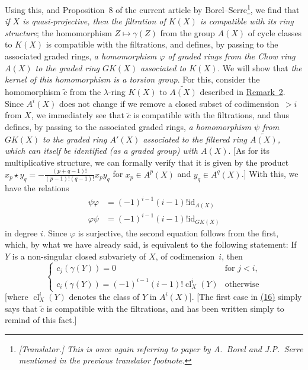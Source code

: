 \documentclass{article}
\DeclareMathOperator{\cl}{cl}
\newcommand{\oldpage}[1]{\marginpar{\footnotesize$\Big\vert$ \textit{p.~#1}}}
\begin{document}
\begin{enumerate}
    \renewcommand*{\thefootnote}{*}
    Using this, and Proposition~8 of the current article by Borel--Serre\footnote{\emph{[Translator.] This is once again referring to paper by A.~Borel and J.P.~Serre mentioned in the previous translator footnote.}}, we find that \emph{if $X$ is quasi-projective, then the filtration of $K(X)$ is compatible with its ring structure};
    the homomorphism $Z\mapsto\gamma(Z)$ from the group $A(X)$ of cycle classes to $K(X)$ is compatible with the filtrations, and defines, by passing to the associated graded rings, \emph{a homomorphism $\varphi$ of graded rings from the Chow ring $A(X)$ to the graded ring $GK(X)$ associated to $K(X)$}.
    We will show that \emph{the kernel of this homomorphism is a torsion group}.
    For this, consider the homomorphism $\widetilde{c}$ from the $\lambda$-ring $K(X)$ to $\widetilde{A(X)}$ described in \hyperref[remark2]{Remark~2}.
    Since $A^i(X)$ does not change if we remove a closed subset of codimension~$>i$ from $X$, we immediately see that $\widetilde{c}$ is compatible with the filtrations, and thus defines, by passing to the associated graded rings, \emph{a homomorphism $\psi$ from $GK(X)$ to the graded ring $A'(X)$ associated to the filtered ring $\widetilde{A(X)}$, which can itself be identified (as a graded group) with $A(X)$}.
    [As for its multiplicative structure, we can formally verify that it is given by the product $x_p\star y_q = -\frac{(p+q-1)!}{(p-1)!(q-1)!}x_p y_q$ for $x_p\in A^p(X)$ and $y_q\in A^q(X)$.]
    With this, we have the relations
    \[
    \label{equation15}
      \begin{aligned}
        \psi\varphi &= (-1)^{i-1}(i-1)!\mathrm{id}_{A(X)}
      \\\varphi\psi &= (-1)^{i-1}(i-1)!\mathrm{id}_{GK(X)}
      \end{aligned}
    \tag{15}
    \]
    in degree $i$.
    Since $\varphi$ is surjective, the second equation follows from the first, which, by what we have already said, is equivalent to the following statement:
    If $Y$
\oldpage{151}
    is a non-singular closed subvariety of $X$, of codimension~$i$, then
    \[
    \label{equation16}
      \begin{cases}
        c_j(\gamma(Y)) = 0 &\mbox{for $j<i$},
      \\c_i(\gamma(Y)) = (-1)^{i-1}(i-1)!\cl_X^i(Y) &\mbox{otherwise}
      \end{cases}
    \tag{16}
    \]
    [where $\cl_X^i(Y)$ denotes the class of $Y$ in $A^i(X)$].
    [The first case in \hyperref[equation16]{(16)} simply says that $\widetilde{c}$ is compatible with the filtrations, and has been written simply to remind of this fact.]

\end{enumerate}
\end{document}
